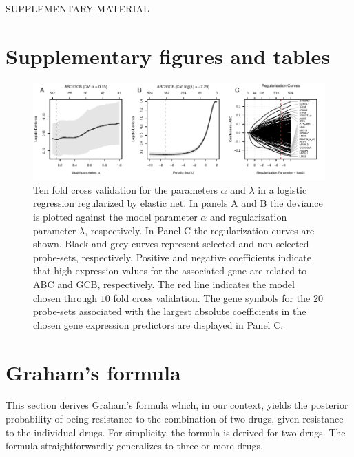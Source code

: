% 
% 

{}
\begin{center}
{\huge SUPPLEMENTARY MATERIAL}\bigskip \\
{\bf \hemaClassTitle{}}
\end{center}

\section{Supplementary figures and tables}

\begin{figure}[htb]
\begin{center}
\includegraphics[width=1\textwidth]{figures/figureS1.pdf}
\end{center}
\caption{Ten fold cross validation for the parameters $\alpha$ and $\lambda$ in a logistic regression regularized by elastic net.
In panels A and B the deviance is plotted against the model parameter $\alpha$ and regularization parameter $\lambda$, respectively.
In Panel C the regularization curves are shown.
Black and grey curves represent selected and non-selected probe-sets, respectively.
Positive and negative coefficients indicate that high expression values for the associated gene are related to ABC and GCB, respectively.
The red line indicates the model chosen through $10$ fold cross validation.
The gene symbols for the $20$ probe-sets associated with the largest absolute coefficients in the chosen gene expression predictors are displayed in Panel C.}
\label{fig:crossval}
\end{figure}





\clearpage



\section{Graham's formula}
\label{sec:graham}
This section derives Graham's formula which, in our context, yields the posterior probability of being resistance to the combination of two drugs, given resistance to the individual drugs.
For simplicity, the formula is derived for two drugs.
The formula straightforwardly generalizes to three or more drugs.

